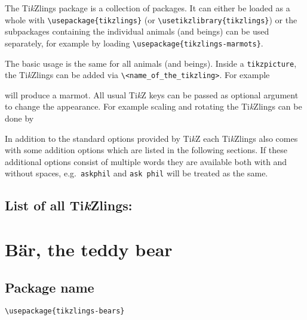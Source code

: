 \documentclass[parskip=half]{scrartcl}
\newcommand{\TikZ}{Ti\emph{k}Z\xspace}
\newcommand{\tikzlings}{Ti\emph{k}Zlings\xspace}
\begin{document}
The \tikzlings package is a collection of packages. It can either be loaded as a whole with \lstinline|\usepackage{tikzlings}| (or \lstinline|\usetikzlibrary{tikzlings}|) or the subpackages containing the individual animals (and beings) can be used separately, for example by loading \lstinline|\usepackage{tikzlings-marmots}|.

The basic usage is the same for all animals (and beings). Inside a \lstinline|tikzpicture|, the \tikzlings can be added via \color{duckblue!50!black}\lstinline|\<name_of_the_tikzling>|\color{black}. For example

\begin{tcblisting}{}
\marmot
\end{tcblisting}

will produce a marmot. All usual \TikZ keys can be passed as optional argument to change the appearance. For example scaling and rotating the \tikzlings can be done by

\begin{tcblisting}{}
\coati[rotate=30,scale=0.5]
\end{tcblisting}

In addition to the standard options provided by \TikZ each \tikzlings also comes with some addition options which are listed in the following sections. If these additional options consist of multiple words they are available both with and without spaces, e.g.\ \lstinline|askphil| and \lstinline|ask phil| will be treated as the same.

\subsection*{List of all \tikzlings:}

\begingroup
	\hypersetup{hidelinks}
	\tableofcontents
\endgroup


\clearpage
\section[\textbackslash bear]{B\"ar, the teddy bear}

\subsection{Package name}

\begin{tcolorbox}[lower separated=false, lefthand width=.8\linewidth]
\vspace*{0.5cm}
\lstinline|\usepackage{tikzlings-bears}|
\vspace*{0.5cm}
\end{tcolorbox}
\end{document}
